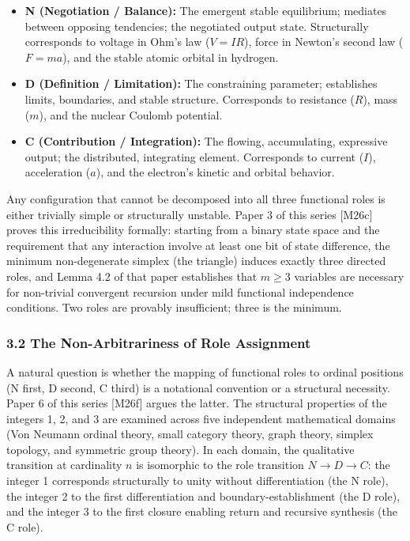 \documentclass[
  11pt,
  letterpaper,
]{article}
\providecommand{\tightlist}{%
  \setlength{\itemsep}{0pt}\setlength{\parskip}{0pt}}
\begin{document}
\begin{itemize}
\tightlist
\item
  \textbf{N (Negotiation / Balance):} The emergent stable equilibrium;
  mediates between opposing tendencies; the negotiated output state.
  Structurally corresponds to voltage in Ohm's law (\(V = IR\)), force
  in Newton's second law (\(F = ma\)), and the stable atomic orbital in
  hydrogen.
\item
  \textbf{D (Definition / Limitation):} The constraining parameter;
  establishes limits, boundaries, and stable structure. Corresponds to
  resistance (\(R\)), mass (\(m\)), and the nuclear Coulomb potential.
\item
  \textbf{C (Contribution / Integration):} The flowing, accumulating,
  expressive output; the distributed, integrating element. Corresponds
  to current (\(I\)), acceleration (\(a\)), and the electron's kinetic
  and orbital behavior.
\end{itemize}

Any configuration that cannot be decomposed into all three functional
roles is either trivially simple or structurally unstable. Paper 3 of
this series {[}M26c{]} proves this irreducibility formally: starting
from a binary state space and the requirement that any interaction
involve at least one bit of state difference, the minimum non-degenerate
simplex (the triangle) induces exactly three directed roles, and Lemma
4.2 of that paper establishes that \(m \ge 3\) variables are necessary
for non-trivial convergent recursion under mild functional independence
conditions. Two roles are provably insufficient; three is the minimum.

\subsubsection{3.2 The Non-Arbitrariness of Role
Assignment}\label{the-non-arbitrariness-of-role-assignment}

A natural question is whether the mapping of functional roles to ordinal
positions (N first, D second, C third) is a notational convention or a
structural necessity. Paper 6 of this series {[}M26f{]} argues the
latter. The structural properties of the integers 1, 2, and 3 are
examined across five independent mathematical domains (Von Neumann
ordinal theory, small category theory, graph theory, simplex topology,
and symmetric group theory). In each domain, the qualitative transition
at cardinality \(n\) is isomorphic to the role transition
\(N \to D \to C\): the integer 1 corresponds structurally to unity
without differentiation (the N role), the integer 2 to the first
differentiation and boundary-establishment (the D role), and the integer
3 to the first closure enabling return and recursive synthesis (the C
role).
\end{document}
